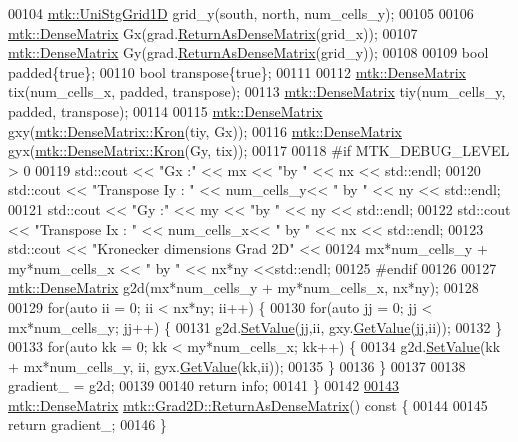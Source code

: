 \begin{DoxyCode}
00104   \hyperlink{classmtk_1_1UniStgGrid1D}{mtk::UniStgGrid1D} grid\_y(south, north, num\_cells\_y);
00105 
00106   \hyperlink{classmtk_1_1DenseMatrix}{mtk::DenseMatrix} Gx(grad.\hyperlink{classmtk_1_1Grad1D_a77b2eddbe4ab03f469306c604d505b1a}{ReturnAsDenseMatrix}(grid\_x));
00107   \hyperlink{classmtk_1_1DenseMatrix}{mtk::DenseMatrix} Gy(grad.\hyperlink{classmtk_1_1Grad1D_a77b2eddbe4ab03f469306c604d505b1a}{ReturnAsDenseMatrix}(grid\_y));
00108 
00109   \textcolor{keywordtype}{bool} padded\{\textcolor{keyword}{true}\};
00110   \textcolor{keywordtype}{bool} transpose\{\textcolor{keyword}{true}\};
00111 
00112   \hyperlink{classmtk_1_1DenseMatrix}{mtk::DenseMatrix} tix(num\_cells\_x, padded, transpose);
00113   \hyperlink{classmtk_1_1DenseMatrix}{mtk::DenseMatrix} tiy(num\_cells\_y, padded, transpose);
00114 
00115   \hyperlink{classmtk_1_1DenseMatrix}{mtk::DenseMatrix} gxy(\hyperlink{classmtk_1_1DenseMatrix_a01d3d8bd502870f93bf3a88a0cc5fb49}{mtk::DenseMatrix::Kron}(tiy, Gx));
00116   \hyperlink{classmtk_1_1DenseMatrix}{mtk::DenseMatrix} gyx(\hyperlink{classmtk_1_1DenseMatrix_a01d3d8bd502870f93bf3a88a0cc5fb49}{mtk::DenseMatrix::Kron}(Gy, tix));
00117 
00118 \textcolor{preprocessor}{  #if MTK\_DEBUG\_LEVEL > 0}
00119   std::cout << \textcolor{stringliteral}{"Gx :"} << mx << \textcolor{stringliteral}{"by "} << nx << std::endl;
00120   std::cout << \textcolor{stringliteral}{"Transpose Iy : "} << num\_cells\_y<< \textcolor{stringliteral}{" by "} << ny  << std::endl;
00121   std::cout << \textcolor{stringliteral}{"Gy :"} << my << \textcolor{stringliteral}{"by "} << ny << std::endl;
00122   std::cout << \textcolor{stringliteral}{"Transpose Ix : "} << num\_cells\_x<< \textcolor{stringliteral}{" by "} << nx  << std::endl;
00123   std::cout << \textcolor{stringliteral}{"Kronecker dimensions Grad 2D"} <<
00124     mx*num\_cells\_y + my*num\_cells\_x << \textcolor{stringliteral}{" by "} <<  nx*ny <<std::endl;
00125 \textcolor{preprocessor}{  #endif}
00126 
00127   \hyperlink{classmtk_1_1DenseMatrix}{mtk::DenseMatrix} g2d(mx*num\_cells\_y + my*num\_cells\_x, nx*ny);
00128 
00129   \textcolor{keywordflow}{for}(\textcolor{keyword}{auto} ii = 0; ii < nx*ny; ii++) \{
00130     \textcolor{keywordflow}{for}(\textcolor{keyword}{auto} jj = 0; jj < mx*num\_cells\_y; jj++) \{
00131       g2d.\hyperlink{classmtk_1_1DenseMatrix_ae0f873a6d3a734da467cafb817da64ae}{SetValue}(jj,ii, gxy.\hyperlink{classmtk_1_1DenseMatrix_a87fb785713c04b13767947cc3325ce7c}{GetValue}(jj,ii));
00132     \}
00133     \textcolor{keywordflow}{for}(\textcolor{keyword}{auto} kk = 0; kk < my*num\_cells\_x; kk++) \{
00134       g2d.\hyperlink{classmtk_1_1DenseMatrix_ae0f873a6d3a734da467cafb817da64ae}{SetValue}(kk + mx*num\_cells\_y, ii, gyx.\hyperlink{classmtk_1_1DenseMatrix_a87fb785713c04b13767947cc3325ce7c}{GetValue}(kk,ii));
00135     \}
00136   \}
00137 
00138   gradient\_ = g2d;
00139 
00140   \textcolor{keywordflow}{return} info;
00141 \}
00142 
\hypertarget{mtk__grad__2d_8cc_source_l00143}{}\hyperlink{classmtk_1_1Grad2D_a4f5a17519455f833bb70b8434c272312}{00143} \hyperlink{classmtk_1_1DenseMatrix}{mtk::DenseMatrix} \hyperlink{classmtk_1_1Grad2D_a4f5a17519455f833bb70b8434c272312}{mtk::Grad2D::ReturnAsDenseMatrix}()\textcolor{keyword}{ const }\{
00144 
00145   \textcolor{keywordflow}{return} gradient\_;
00146 \}
\end{DoxyCode}
